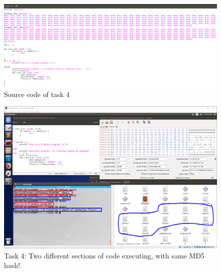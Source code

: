 \documentclass[a4paper]{article}
\begin{document}
\begin{figure}
  \includegraphics[width=\textwidth]{task4_code.png}
  \caption{Source code of task 4}
  \label{task4_code}
\end{figure}
\begin{figure}
  \includegraphics[width=\textwidth]{task4.png}
  \caption{Task 4: Two different sections of code executing, with same MD5 hash!}
  \label{task4}
\end{figure}
\end{document}
